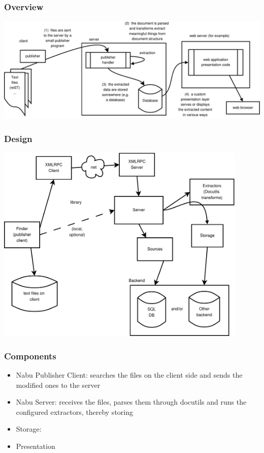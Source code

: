 \documentclass[compress,trans]{beamer}
\begin{document}
\begin{frame}[fragile]
  \frametitle{Overview}

\includegraphics[width=1.0\textwidth]{../nabu2.pdf}

\end{frame}



\begin{frame}[fragile]
  \frametitle{Design}

\includegraphics[width=0.9\textwidth]{../nabu1.pdf}

\end{frame}



\begin{frame}[fragile]
  \frametitle{Components}

  \begin{itemize}
  \item Nabu Publisher Client: searches the files on the client side and sends
    the modified ones to the server

  \item Nabu Server: receives the files, parses them through docutils and runs
    the configured extractors, thereby storing 

  \item Storage: 

  \item Presentation

  \end{itemize}

\end{frame}
\end{document}
